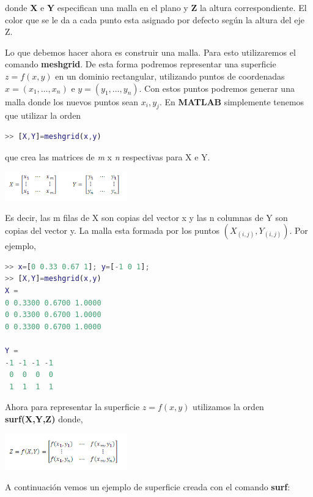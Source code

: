 donde \textbf{X} e \textbf{Y} especifican una malla en el plano y \textbf{Z} la altura correspondiente. El color que se le da a cada punto esta asignado por defecto según la altura del eje Z.

Lo que debemos hacer ahora es construir una malla. Para esto utilizaremos el comando \textbf{meshgrid}. De esta forma podremos representar una superficie $ z = f(x,y) $ en un dominio rectangular, utilizando puntos de coordenadas $ x = (x_{1},\ldots, x_{n}) $ e $ y = (y_{1},\ldots, y_{n}) $. Con estos puntos podremos generar una malla donde los nuevos puntos sean $ x_{i},y_{j} $. En \textbf{MATLAB} simplemente tenemos que utilizar la orden

\begin{lstlisting}[language=Matlab]
>> [X,Y]=meshgrid(x,y)
\end{lstlisting}

que crea las matrices de \textit{m} x \textit{n} respectivas para X e Y.

\begin{center}
\includegraphics[width=150pt]{./Imagenes/matrices.png}
\end{center}


Es decir, las m filas de X son copias del vector x y las n columnas de Y son copias del vector y. La malla esta formada por los puntos $(X_{(i,j)},Y_{(i,j)})$. Por ejemplo,

\begin{lstlisting}[language=Matlab]
>> x=[0 0.33 0.67 1]; y=[-1 0 1];
>> [X,Y]=meshgrid(x,y)
X =
0 0.3300 0.6700 1.0000
0 0.3300 0.6700 1.0000
0 0.3300 0.6700 1.0000

Y =
-1 -1 -1 -1
 0  0  0  0
 1  1  1  1
\end{lstlisting}

Ahora para representar la superficie $z = f(x, y)$ utilizamos la orden \textbf{surf(X,Y,Z)} donde,

\begin{center}
\includegraphics[width=150pt]{./Imagenes/matrices2.png}
\end{center}

A continuación vemos un ejemplo de superficie creada con el comando \textbf{surf}:

